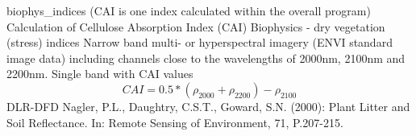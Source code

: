 %
{ %
biophys\_indices (CAI is one index calculated within the overall program)
}
%
{ %
Calculation of Cellulose Absorption Index (CAI)
}
%
{ %
Biophysics - dry vegetation (stress) indices
}
%
{ %
Narrow band multi- or hyperspectral imagery (ENVI standard image data) including channels close to the wavelengths of 2000nm, 2100nm and 2200nm.\bigskip
}
%
{ %
Single band with CAI values
}
%
{ %
\begin{displaymath}
CAI = 0.5 * ( \rho _{2000} + \rho _{2200} ) - \rho _{2100}
\end{displaymath}
}
%
{ %
DLR-DFD
}
%
{ %
Nagler, P.L., Daughtry, C.S.T., Goward, S.N. (2000): Plant Litter and Soil Reflectance. In: Remote Sensing of Environment, 71, P.207-215.
}
